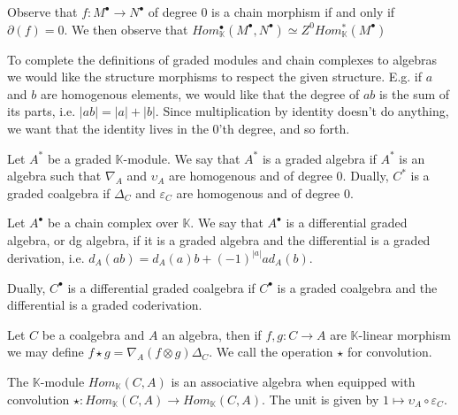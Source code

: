 \documentclass[../thesis.tex]{subfiles}
\begin{document}
            Observe that $f:M^{\bullet}\rightarrow N^{\bullet}$ of degree $0$ is a chain morphism if and only if $\partial(f) = 0$. We then observe that $Hom_{\mathbb{K}}^{\bullet}(M^{\bullet},N^{\bullet})\simeq Z^0Hom_{\mathbb{K}}^*(M^{\bullet})$


            To complete the definitions of graded modules and chain complexes to algebras we would like the structure morphisms to respect the given structure. E.g. if $a$ and $b$ are homogenous elements, we would like that the degree of $ab$ is the sum of its parts, i.e. $|ab| = |a| + |b|$. Since multiplication by identity doesn't do anything, we want that the identity lives in the $0$'th degree, and so forth.

            \begin{definition}
                Let $A^*$ be a graded $\mathbb{K}$-module. We say that $A^*$ is a graded algebra if $A^*$ is an algebra such that $\nabla_A$ and $\upsilon_A$ are homogenous and of degree $0$.
                Dually, $C^*$ is a graded coalgebra if $\Delta_C$ and $\varepsilon_C$ are homogenous and of degree $0$.
            \end{definition}

            \begin{definition}
                Let $A^{\bullet}$ be a chain complex over $\mathbb{K}$. We say that $A^{\bullet}$ is a differential graded algebra, or dg algebra, if it is a graded algebra and the differential is a graded derivation, i.e. $d_A(ab) = d_A(a)b + (-1)^{|a|}ad_A(b)$.

                Dually, $C^{\bullet}$ is a differential graded coalgebra if $C^{\bullet}$ is a graded coalgebra and the differential is a graded coderivation.
            \end{definition}

            Let $C$ be a coalgebra and $A$ an algebra, then if $f,g:C\rightarrow A$ are $\mathbb{K}$-linear morphism we may define $f\star g = \nabla_A(f\otimes g)\Delta_C$. We call the operation $\star$ for convolution.

            \begin{proposition}
                The $\mathbb{K}$-module $Hom_{\mathbb{K}}(C,A)$ is an associative algebra when equipped with convolution $\star:Hom_{\mathbb{K}}(C,A)\rightarrow Hom_{\mathbb{K}}(C,A)$. The unit is given by $1 \mapsto \upsilon_A\circ\varepsilon_C$.
            \end{proposition}
\end{document}
